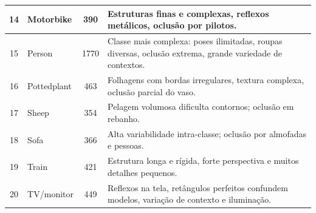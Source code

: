 \begin{table}[h!]
\begin{tabular}{|c|l|c|p{9cm}|}
14 & Motorbike     & 390 & Estruturas finas e complexas, reflexos metálicos, oclusão por pilotos. \\ \hline
15 & Person        & 1770 & Classe mais complexa: poses ilimitadas, roupas diversas, oclusão extrema, grande variedade de contextos. \\ \hline
16 & Pottedplant   & 463 & Folhagens com bordas irregulares, textura complexa, oclusão parcial do vaso. \\ \hline
17 & Sheep         & 354 & Pelagem volumosa dificulta contornos; oclusão em rebanho. \\ \hline
18 & Sofa          & 366 & Alta variabilidade intra-classe; oclusão por almofadas e pessoas. \\ \hline
19 & Train         & 421 & Estrutura longa e rígida, forte perspectiva e muitos detalhes pequenos. \\ \hline
20 & TV/monitor    & 449 & Reflexos na tela, retângulos perfeitos confundem modelos, variação de contexto e iluminação. \\ \hline

\end{tabular}
\end{table}



        
        
